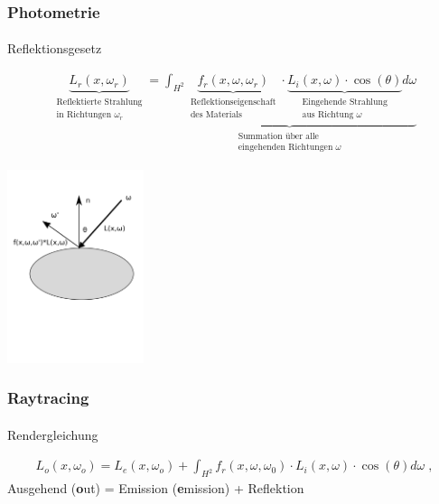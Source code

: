 \documentclass{beamer}
\begin{document}
\begin{frame}
    \frametitle{Photometrie}
\framesubtitle{}
\begin{block}{Reflektionsgesetz}

\begin{align*}
\underbrace{L_r(x, \omega_r)}_{\substack{\text{Reflektierte Strahlung} \\ \text{in Richtungen $\omega_r$}}} =\underbrace{\int_{H^2} \underbrace{f_r (x, \omega, \omega_r)}_{\substack{\text{Reflektionseigenschaft} \\ \text{des Materials}}} \cdot  \underbrace{L_i(x, \omega) \cdot  \cos(\theta) }_{\substack{\text{Eingehende Strahlung} \\ \text{aus Richtung $\omega$}}} d\omega}_{\substack{\text{Summation über  alle } \\ \text{eingehenden Richtungen $\omega$}}} 
\end{align*}
  \begin{center}
    \includegraphics[width=0.3\textwidth]{images/brdf.png}
\end{center}
\end{block}
\end{frame}


\begin{frame}
    \frametitle{Raytracing}
\framesubtitle{}
\begin{block}{Rendergleichung}

\begin{align}
L_o(x, \omega_o) = L_e(x, \omega_o)  + \displaystyle \int_{H^2}f_r (x, \omega, \omega_0) \cdot L_i(x, \omega)  \cdot  \cos(\theta) d\omega \; ,
\end{align}
Ausgehend (\textbf{o}ut) = Emission (\textbf{e}mission) + Reflektion
\end{block}
\end{frame}
\end{document}
